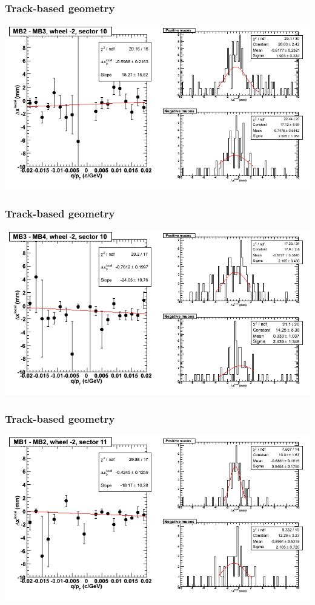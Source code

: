 \documentclass[compress]{beamer}
\begin{document}
\begin{frame}
\frametitle{Track-based geometry}
\includegraphics[width=\linewidth]{NOV4_segdiffs/dt13_resid_A_10_23.png}
\end{frame}

\begin{frame}
\frametitle{Track-based geometry}
\includegraphics[width=\linewidth]{NOV4_segdiffs/dt13_resid_A_10_34.png}
\end{frame}

\begin{frame}
\frametitle{Track-based geometry}
\includegraphics[width=\linewidth]{NOV4_segdiffs/dt13_resid_A_11_12.png}
\end{frame}
\end{document}
